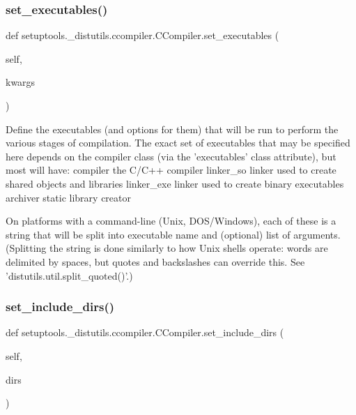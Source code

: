 \subsubsection{\texorpdfstring{set\+\_\+executables()}{set\_executables()}}
{\footnotesize\ttfamily def setuptools.\+\_\+distutils.\+ccompiler.\+C\+Compiler.\+set\+\_\+executables (\begin{DoxyParamCaption}\item[{}]{self,  }\item[{}]{kwargs }\end{DoxyParamCaption})}

\begin{DoxyVerb}Define the executables (and options for them) that will be run
to perform the various stages of compilation.  The exact set of
executables that may be specified here depends on the compiler
class (via the 'executables' class attribute), but most will have:
  compiler      the C/C++ compiler
  linker_so     linker used to create shared objects and libraries
  linker_exe    linker used to create binary executables
  archiver      static library creator

On platforms with a command-line (Unix, DOS/Windows), each of these
is a string that will be split into executable name and (optional)
list of arguments.  (Splitting the string is done similarly to how
Unix shells operate: words are delimited by spaces, but quotes and
backslashes can override this.  See
'distutils.util.split_quoted()'.)
\end{DoxyVerb}
 \mbox{\label{classsetuptools_1_1__distutils_1_1ccompiler_1_1CCompiler_a17d11c3886ab77a8de5eab72e4ebc0fb}} 
\subsubsection{\texorpdfstring{set\+\_\+include\+\_\+dirs()}{set\_include\_dirs()}}
{\footnotesize\ttfamily def setuptools.\+\_\+distutils.\+ccompiler.\+C\+Compiler.\+set\+\_\+include\+\_\+dirs (\begin{DoxyParamCaption}\item[{}]{self,  }\item[{}]{dirs }\end{DoxyParamCaption})}

